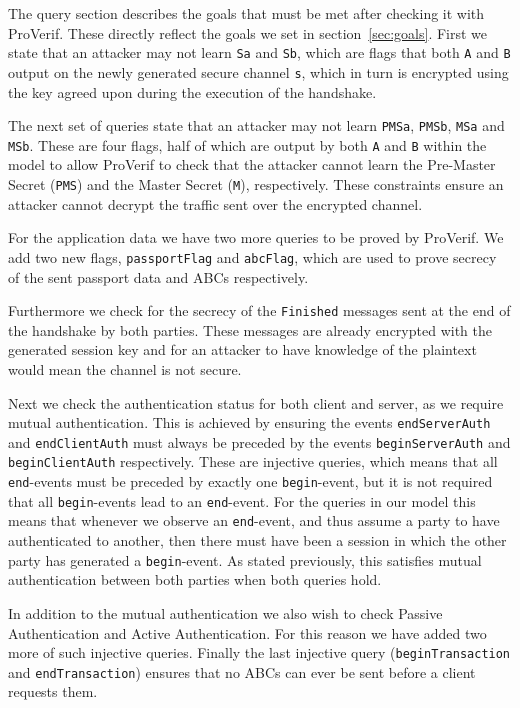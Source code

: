 The query section describes the goals that must be met after checking it with ProVerif. These directly reflect the goals we set in section~\ref{sec:goals}. First we state that an attacker may not learn \texttt{Sa} and \texttt{Sb}, which are flags that both \texttt{A} and \texttt{B} output on the newly generated secure channel \texttt{s}, which in turn is encrypted using the key agreed upon during the execution of the handshake.

The next set of queries state that an attacker may not learn \texttt{PMSa}, \texttt{PMSb}, \texttt{MSa} and \texttt{MSb}. These are four flags, half of which are output by both \texttt{A} and \texttt{B} within the model to allow ProVerif to check that the attacker cannot learn the Pre-Master Secret (\texttt{PMS}) and the Master Secret (\texttt{M}), respectively. These constraints ensure an attacker cannot decrypt the traffic sent over the encrypted channel.

For the application data we have two more queries to be proved by ProVerif. We add two new flags, \texttt{passportFlag} and \texttt{abcFlag}, which are used to prove secrecy of the sent passport data and ABCs respectively.

Furthermore we check for the secrecy of the \texttt{Finished} messages sent at the end of the handshake by both parties. These messages are already encrypted with the generated session key and for an attacker to have knowledge of the plaintext would mean the channel is not secure.

Next we check the authentication status for both client and server, as we require mutual authentication. This is achieved by ensuring the events \texttt{endServerAuth} and \texttt{endClientAuth} must always be preceded by the events \texttt{beginServerAuth} and \texttt{beginClientAuth} respectively. These are injective queries, which means that all \texttt{end}-events must be preceded by exactly one \texttt{begin}-event, but it is not required that all \texttt{begin}-events lead to an \texttt{end}-event. For the queries in our model this means that whenever we observe an \texttt{end}-event, and thus assume a party to have authenticated to another, then there must have been a session in which the other party has generated a \texttt{begin}-event. As stated previously, this satisfies mutual authentication between both parties when both queries hold.

In addition to the mutual authentication we also wish to check Passive Authentication and Active Authentication. For this reason we have added two more of such injective queries. Finally the last injective query (\texttt{beginTransaction} and \texttt{endTransaction}) ensures that no ABCs can ever be sent before a client requests them.

